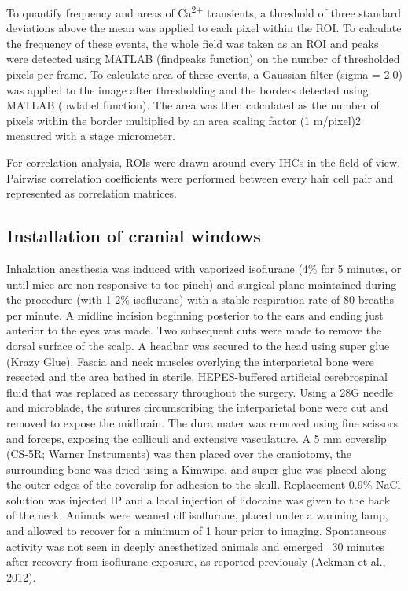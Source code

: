 \documentclass[9pt,lineno]{elife}
\begin{document}
To quantify frequency and areas of Ca\textsuperscript{2+} transients, a threshold of three standard deviations above the mean was applied to each pixel within the ROI. To calculate the frequency of these events, the whole field was taken as an ROI and peaks were detected using MATLAB (findpeaks function) on the number of thresholded pixels per frame. To calculate area of these events, a Gaussian filter (sigma = 2.0) was applied to the image after thresholding and the borders detected using MATLAB (bwlabel function). The area was then calculated as the number of pixels within the border multiplied by an area scaling factor (1 \textmu m/pixel)2 measured with a stage micrometer. 

For correlation analysis, ROIs were drawn around every IHCs in the field of view. Pairwise correlation coefficients were performed between every hair cell pair and represented as correlation matrices.

\subsection{Installation of cranial windows}
Inhalation anesthesia was induced with vaporized isoflurane (4\% for 5 minutes, or until mice are non-responsive to toe-pinch) and surgical plane maintained during the procedure (with 1-2\% isoflurane) with a stable respiration rate of 80 breaths per minute. A midline incision beginning posterior to the ears and ending just anterior to the eyes was made. Two subsequent cuts were made to remove the dorsal surface of the scalp. A headbar was secured to the head using super glue (Krazy Glue). Fascia and neck muscles overlying the interparietal bone were resected and the area bathed in sterile, HEPES-buffered artificial cerebrospinal fluid that was replaced as necessary throughout the surgery. Using a 28G needle and microblade, the sutures circumscribing the interparietal bone were cut and removed to expose the midbrain. The dura mater was removed using fine scissors and forceps, exposing the colliculi and extensive vasculature. A 5 mm coverslip (CS-5R; Warner Instruments) was then placed over the craniotomy, the surrounding bone was dried using a Kimwipe, and super glue was placed along the outer edges of the coverslip for adhesion to the skull. Replacement 0.9\% NaCl solution was injected IP and a local injection of lidocaine was given to the back of the neck. Animals were weaned off isoflurane, placed under a warming lamp, and allowed to recover for a minimum of 1 hour prior to imaging. Spontaneous activity was not seen in deeply anesthetized animals and emerged ~30 minutes after recovery from isoflurane exposure, as reported previously (Ackman et al., 2012).
\end{document}
